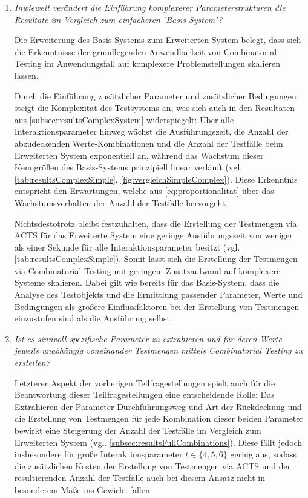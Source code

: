 \begin{enumerate}
\item \textit{Inwieweit verändert die Einführung komplexerer Parameterstrukturen die Resultate im Vergleich zum einfacheren 'Basis-System'?}

Die Erweiterung des Basis-Systems zum Erweiterten System belegt, dass sich die Erkenntnisse der grundlegenden Anwendbarkeit von Combinatorial Testing im Anwendungsfall auf komplexere Problemstellungen skalieren lassen. 

Durch die Einführung zusätzlicher Parameter und zusätzlicher Bedingungen steigt die Komplexität des Testsystems an, was sich auch in den Resultaten aus \autoref{subsec:resultsComplexSystem} widerspiegelt: Über alle Interaktionsparameter hinweg wächst die Ausführungszeit, die Anzahl der abzudeckenden Werte-Kombinationen und die Anzahl der Testfälle beim Erweiterten System exponentiell an, während das Wachstum dieser Kenngrößen des Basis-Systems prinzipiell linear verläuft (vgl. \autoref{tab:resultsComplexSimple}, \autoref{fig:vergleichSimpleComplex}). Diese Erkenntnis entspricht den Erwartungen, welche aus \autoref{eq:proportionalität} über das Wachstumsverhalten der Anzahl der Testfälle hervorgeht.

Nichtsdestotrotz bleibt festzuhalten, dass die Erstellung der Testmengen via ACTS für das Erweiterte System eine geringe Ausführungszeit von weniger als einer Sekunde für alle Interaktionsparameter besitzt (vgl. \autoref{tab:resultsComplexSimple}). Somit lässt sich die Erstellung der Testmengen via Combinatorial Testing mit geringem Zusatzaufwand auf komplexere Systeme skalieren. Dabei gilt wie bereits für das Basis-System, dass die Analyse des Testobjekts und die Ermittlung passender Parameter, Werte und Bedingungen als größere Einflussfaktoren bei der Erstellung von Testmengen einzustufen sind als die Ausführung selbst.

\item \textit{Ist es sinnvoll spezifische Parameter zu extrahieren und für deren Werte jeweils unabhängig voneinander Testmengen mittels Combinatorial Testing zu erstellen?}

Letzterer Aspekt der vorherigen Teilfragestellungen spielt auch für die Beantwortung dieser Teilfragestellungen eine entscheidende Rolle: Das Extrahieren der Parameter Durchführungsweg und Art der Rückdeckung und die Erstellung von Testmengen für jede Kombination dieser beiden Parameter bewirkt eine Steigerung der Anzahl der Testfälle im Vergleich zum Erweiterten System (vgl. \autoref{subsec:resultsFullCombinations}). Diese fällt jedoch insbesondere für große Interaktionsparameter $t \in \{4,5,6\}$ gering aus, sodass die zusätzlichen Kosten der Erstellung von Testmengen via ACTS und der resultierenden Anzahl der Testfälle auch bei diesem Ansatz nicht in besonderem Maße ins Gewicht fallen.


\end{enumerate}
